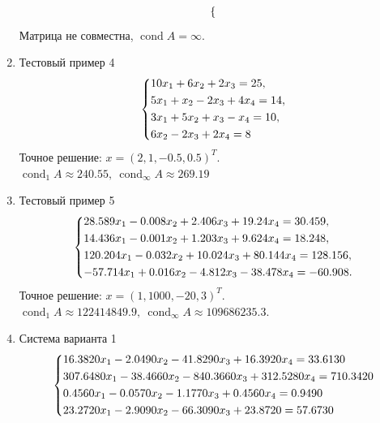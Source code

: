 \documentclass{article}
\newcommand{\cond}{\mathop{\mathrm{cond}}\nolimits}
\begin{document}
\begin{enumerate}
\begin{equation}
\begin{dcases}
                \end{dcases}
            \end{equation}
        Матрица не совместна, $\cond A = \infty$.
        \item Тестовый пример 4
        \begin{equation}
            \begin{dcases}
                10x_1 + 6x_2 + 2x_3 = 25, \\
                5x_1  + x_2 - 2x_3 + 4x_4 = 14, \\ 
                3x_1 + 5x_2 + x_3 - x_4 = 10, \\
                6x_2 -2x_3 +2x_4 = 8
            \end{dcases}
        \end{equation}
        Точное решение: $x = (2, 1, -0.5, 0.5)^T$. \newline
            $\cond_1 A \approx 240.55, \  \cond_\infty A \approx 269.19$
        \item Тестовый пример 5
        \begin{equation}
            \begin{dcases}
                28.589x_1 -0.008x_2+ 2.406x_3+ 19.24x_4 = 30.459, \\ 
                14.436x_1 -0.001x_2 + 1.203x_3 + 9.624x_4 = 18.248, \\
                120.204x_1 -0.032x_2 + 10.024x_3 +  80.144x_4 = 128.156, \\
                -57.714x_1 + 0.016x_2 -4.812x_3 -38.478x_4 = -60.908.
            \end{dcases}
        \end{equation}
        Точное решение: $x = (1, 1000, -20, 3)^T$. \newline
            $\cond_1 A \approx 122414849.9, \  \cond_\infty A \approx 109686235.3.$
        \item Система варианта 1
        \begin{equation}
            \begin{dcases}
                16.3820x_1 -2.0490x_2 -41.8290x_3 + 16.3920x_4 = 33.6130\\
                307.6480x_1 -38.4660x_2 -840.3660x_3 + 312.5280x_4 = 710.3420 \\
                0.4560x_1 -0.0570x_2 -1.1770x_3 + 0.4560x_4 = 0.9490 \\ 
                23.2720x_1 -2.9090x_2 -66.3090x_3 + 23.8720 = 57.6730
            \end{dcases}

\end{equation}
\end{enumerate}
\end{document}
